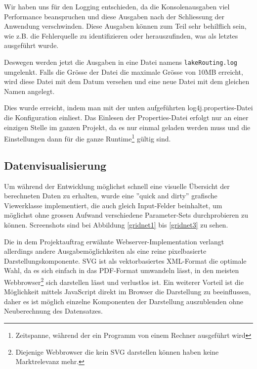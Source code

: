 Wir haben uns für den Logging entschieden, da die Konsolenausgaben viel
Performance beanspruchen und diese Ausgaben nach der Schliessung der Anwendung
verschwinden. Diese Ausgaben können zum Teil sehr behilflich sein, wie z.B.
die Fehlerquelle zu identifizieren oder herauszufinden, was als letztes
ausgeführt wurde. 

Deswegen werden jetzt die Ausgaben in eine Datei namens
\texttt{lakeRouting.log} umgelenkt. Falls die Grösse der Datei die maximale
Grösse von 10MB erreicht, wird diese Datei mit dem Datum versehen und eine
neue Datei mit dem gleichen Namen angelegt.

Dies wurde erreicht, indem man mit der unten aufgeführten
log4j.properties-Datei die Konfiguration einliest. Das Einlesen der
Properties-Datei erfolgt nur an einer einzigen Stelle im ganzen Projekt, da es
nur einmal geladen werden muss und die Einstellungen dann für die ganze
Runtime\footnote{Zeitspanne, während der ein Programm von einem Rechner
ausgeführt wird} gültig sind.



\subsection{Datenvisualisierung}
Um während der Entwicklung möglichst schnell eine visuelle Übersicht der
berechneten Daten zu erhalten, wurde eine ''quick and dirty'' grafische
Viewerklasse implementiert, die auch gleich Input-Felder beinhaltet, um
möglichst ohne grossen Aufwand verschiedene Parameter-Sets durchprobieren zu
können. Screenshots sind bei Abbildung \ref{gridnet1} bis \ref{gridnet3} zu
sehen.

Die in dem Projektauftrag erwähnte Webserver-Implementation verlangt
allerdings andere Ausgabemöglichkeiten als eine reine pixelbasierte
Darstellungskomponente. SVG ist als vektorbasiertes XML-Format die optimale
Wahl, da es sich einfach in das PDF-Format umwandeln lässt, in den meisten
Webbrowser\footnote{Diejenige Webbrowser die kein SVG darstellen können haben
keine Marktrelevanz mehr.} sich darstellen lässt und verlustlos ist. Ein
weiterer Vorteil ist die Möglichkeit mittels JavaScript direkt im Browser die
Darstellung zu beeinflussen, daher es ist möglich einzelne Komponenten der
Darstellung auszublenden ohne Neuberechnung des Datensatzes.

